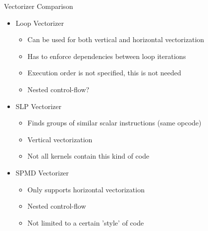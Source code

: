 \begin{frame}{Vectorizer Comparison}

\begin{itemize}
    \item Loop Vectorizer
    \begin{itemize}
        \item Can be used for both vertical and horizontal vectorization
        \item Has to enforce dependencies between loop iterations
        \item Execution order is not specified, this is not needed
        \item Nested control-flow?
    \end{itemize}

    \item SLP Vectorizer
    \begin{itemize}
        \item Finds groups of similar scalar instructions (same opcode)
        \item Vertical vectorization
        \item Not all kernels contain this kind of code
    \end{itemize}

    \item SPMD Vectorizer
    \begin{itemize}
        \item Only supports horizontal vectorization
        \item Nested control-flow
        \item Not limited to a certain 'style' of code
    \end{itemize}
\end{itemize}

\end{frame}
